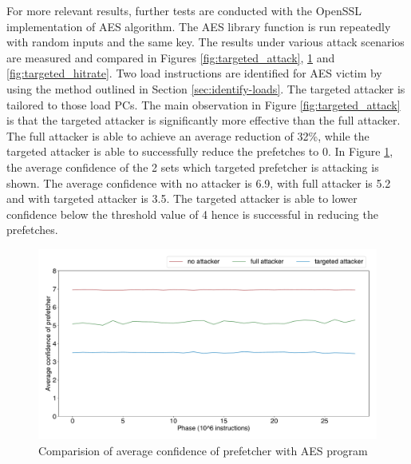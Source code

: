 \documentclass[conference]{IEEEtran}
\begin{document}
For more relevant results, further tests are conducted with the OpenSSL
implementation of AES algorithm. The AES library function is run repeatedly
with random inputs and the same key. The results under various attack
scenarios are measured and compared in Figures \ref{fig:targeted_attack},
\ref{fig:targeted_avgconf} and \ref{fig:targeted_hitrate}.
Two load instructions are identified for AES victim by using the method outlined
in Section \ref{sec:identify-loads}. The targeted attacker is tailored to those load PCs.
The main observation in Figure \ref{fig:targeted_attack} is that the targeted attacker
is significantly more effective than the full attacker. The full attacker is
able to achieve an average reduction of 32\%, while the targeted attacker is able
to successfully reduce the prefetches to 0.
In Figure \ref{fig:targeted_avgconf}, the average confidence of the 2 sets which targeted
prefetcher is attacking is shown. The average confidence with no attacker is 6.9,
with full attacker is 5.2 and with targeted attacker is 3.5. The targeted attacker
is able to lower confidence below the threshold value of 4 hence is successful
in reducing the prefetches.

\begin{figure}[htbp]
    \centering
    \includegraphics[width=\columnwidth]{avg_conf}
    \caption{Comparision of average confidence of prefetcher with AES program}
    \label{fig:targeted_avgconf}
\end{figure}
\end{document}
